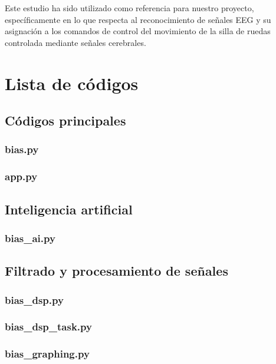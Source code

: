 \documentclass{article}
\begin{document}
Este estudio ha sido utilizado como referencia para nuestro proyecto, específicamente en lo que respecta al reconocimiento de señales EEG y su asignación a los comandos de control del movimiento de la silla de ruedas controlada mediante señales cerebrales.



\section{Lista de códigos}

\subsection{Códigos principales}

\subsubsection{bias.py}


\subsubsection{app.py}

\subsection{Inteligencia artificial}

\subsubsection{bias\_ai.py}


\subsection{Filtrado y procesamiento de señales}

\subsubsection{bias\_dsp.py}

\subsubsection{bias\_dsp\_task.py}

\subsubsection{bias\_graphing.py} 

\end{document}
